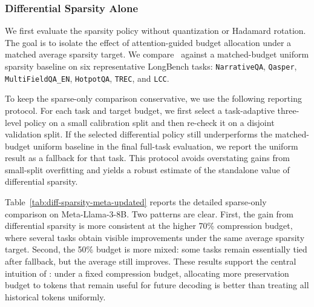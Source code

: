 %

\subsubsection{Differential Sparsity Alone}
\label{sec:diff-sparsity-alone}

We first evaluate the sparsity policy without quantization or Hadamard rotation.
The goal is to isolate the effect of attention-guided budget allocation under a
matched average sparsity target.
We compare \method\ against a matched-budget uniform sparsity baseline on six
representative LongBench tasks:
\texttt{NarrativeQA}, \texttt{Qasper}, \texttt{MultiFieldQA\_EN},
\texttt{HotpotQA}, \texttt{TREC}, and \texttt{LCC}.

To keep the sparse-only comparison conservative, we use the following reporting
protocol.
For each task and target budget, we first select a task-adaptive three-level
policy on a small calibration split and then re-check it on a disjoint
validation split.
If the selected differential policy still underperforms the matched-budget
uniform baseline in the final full-task evaluation, we report the uniform result
as a fallback for that task.
This protocol avoids overstating gains from small-split overfitting and yields a
robust estimate of the standalone value of differential sparsity.

Table~\ref{tab:diff-sparsity-meta-updated} reports the detailed sparse-only
comparison on Meta-Llama-3-8B.
Two patterns are clear.
First, the gain from differential sparsity is more consistent at the higher
70\% compression budget, where several tasks obtain visible improvements under
the same average sparsity target.
Second, the 50\% budget is more mixed: some tasks remain essentially tied after
fallback, but the average still improves.
These results support the central intuition of \method:
under a fixed compression budget, allocating more preservation budget to tokens
that remain useful for future decoding is better than treating all historical
tokens uniformly.

